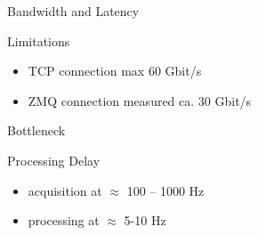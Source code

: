\documentclass[aspectratio=169]{beamer}
\begin{document}
\begin{frame}{Bandwidth and Latency}
 \begin{block}{Limitations}
  \begin{itemize}
   \item TCP connection max 60 Gbit/s
   \item ZMQ connection measured ca. 30 Gbit/s
  \end{itemize}
 \end{block}
 
 \begin{block}{Bottleneck}
 \end{block}
 
 \begin{block}{Processing Delay}
  \begin{itemize}
   \item acquisition at $\approx$ 100 -- 1000 Hz
   \item processing at $\approx$ 5-10 Hz
  \end{itemize}

 \end{block}
\end{frame}
\end{document}
